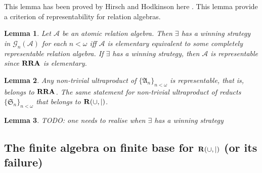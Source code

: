 \documentclass[a4paper]{article}
\theoremstyle{defin}
\theoremstyle{theorem}
\theoremstyle{prop}
\theoremstyle{lemma}
\newtheorem{lemma}{Lemma}
\theoremstyle{ex}
\theoremstyle{col}
\begin{document}
This lemma has been proved by Hirsch and Hodkinson here \cite{hirsch1997step}. This lemma provide a criterion of representability for relation algebras.

\begin{lemma}
  Let $\mathcal{A}$ be an atomic relation algebra. Then $\exists$ has a winning strategy in $\mathcal{G}_n({\mathcal{A}})$ for each $n < \omega$ iff $\mathcal{A}$ is elementary equivalent to some completely representable relation algebra. If $\exists$ has a winning strategy, then $\mathcal{A}$ is representable since ${\bf RRA}$ is elementary.
\end{lemma}

\begin{lemma}
  Any non-trivial ultraproduct of $\{ \mathfrak{A}_n \}_{n < \omega}$ is representable, that is, belongs to ${\bf RRA}$. The same statement for non-trivial ultraproduct of reducts $\{ \mathfrak{S}_n \}_{n < \omega}$ that belongs to ${\bf R}(\cup, |)$.
\end{lemma}

\begin{lemma}
  TODO: one needs to realise when $\exists$ has a winning strategy
\end{lemma}

\subsection{The finite algebra on finite base for ${\bf R}(\cup, |)$ (or its failure)}



\end{document}
